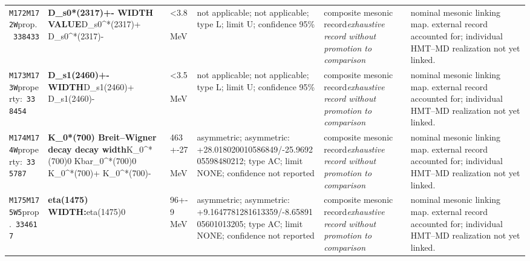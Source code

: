 \begin{landscape}
\begin{longtable}{L{1.85cm}L{4.45cm}L{2.35cm}L{4.05cm}L{3.35cm}L{7.15cm}}
\texttt{M172}\newline \texttt{M172W}\newline prop.\ \texttt{338433} & \textbf{D\_\allowbreak{}s0*(2317)+- WIDTH VALUE}\newline D\_\allowbreak{}s0\textasciicircum{}*(2317)+ \textbar{}\allowbreak{} D\_\allowbreak{}s0\textasciicircum{}*(2317)- & \textless{}3.8\,MeV & not applicable; not applicable; type L; limit U; confidence 95\% & composite mesonic record\newline \emph{exhaustive record without promotion to comparison} & nominal mesonic linking map. external record accounted for; individual HMT--MD realization not yet linked. \\
\texttt{M173}\newline \texttt{M173W}\newline property:\ \texttt{338454} & \textbf{D\_\allowbreak{}s1(2460)+- WIDTH}\newline D\_\allowbreak{}s1(2460)+ \textbar{}\allowbreak{} D\_\allowbreak{}s1(2460)- & \textless{}3.5\,MeV & not applicable; not applicable; type L; limit U; confidence 95\% & composite mesonic record\newline \emph{exhaustive record without promotion to comparison} & nominal mesonic linking map. external record accounted for; individual HMT--MD realization not yet linked. \\
\texttt{M174}\newline \texttt{M174W}\newline property:\ \texttt{335787} & \textbf{K\_\allowbreak{}0*(700) Breit--Wigner decay decay width}\newline K\_\allowbreak{}0\textasciicircum{}*(700)0 \textbar{}\allowbreak{} Kbar\_\allowbreak{}0\textasciicircum{}*(700)0 \textbar{}\allowbreak{} K\_\allowbreak{}0\textasciicircum{}*(700)+ \textbar{}\allowbreak{} K\_\allowbreak{}0\textasciicircum{}*(700)- & 463+-27\,MeV & asymmetric; asymmetric: +28.018020010586849/-25.969205598480212; type AC; limit NONE; confidence not reported & composite mesonic record\newline \emph{exhaustive record without promotion to comparison} & nominal mesonic linking map. external record accounted for; individual HMT--MD realization not yet linked. \\
\texttt{M175}\newline \texttt{M175W5}\newline prop.\ \texttt{334617} & \textbf{eta(1475) WIDTH:}\newline eta(1475)0 & 96+-9\,MeV & asymmetric; asymmetric: +9.1647781281613359/-8.6589105601013205; type AC; limit NONE; confidence not reported & composite mesonic record\newline \emph{exhaustive record without promotion to comparison} & nominal mesonic linking map. external record accounted for; individual HMT--MD realization not yet linked. \\

\end{longtable}
\end{landscape}
